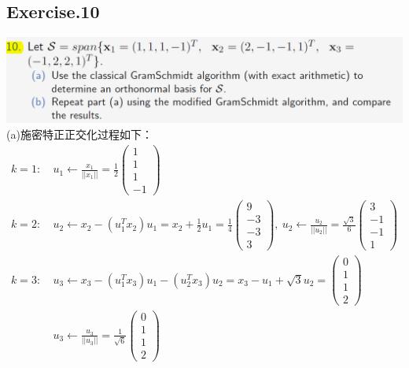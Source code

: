 \documentclass[UTF8,12pt, a4paper]{ctexart}
\begin{document}
\subsection*{Exercise.10}
\includegraphics[scale=0.8]{question10.png}\\
(a)施密特正正交化过程如下：
\begin{align*}
  k=1: &\  u_1 \leftarrow \frac{x_1}{||x_1||} 
  = \frac{1}{2}
  \left(
    \begin{matrix}
      1 \\ 1\\ 1\\ -1
    \end{matrix}
  \right) \\
  k=2: &\  u_2 \leftarrow x_2-(u_1^Tx_2)u_1 
  = x_2+\frac{1}{2}u_1 
  = \frac{1}{4} 
  \left(
    \begin{matrix}
      9 \\ -3 \\ -3 \\ 3
    \end{matrix}
  \right),\ u_2\leftarrow \frac{u_2}{||u_2||}
  = \frac{\sqrt{3}}{6} \left(
    \begin{matrix}
      3 \\ -1 \\ -1 \\ 1
    \end{matrix}  
  \right) \\
  k=3: &\  u_3 \leftarrow x_3 -(u_1^T x_3)u_1 - (u_2^Tx_3)u_2 =x_3-u_1+\sqrt{3}u_2 
  =\left(
    \begin{matrix}
      0 \\ 1 \\ 1 \\ 2
    \end{matrix}  
  \right) \\
  &\  u_3 \leftarrow \frac{u_3}{||u_3||} 
  = \frac{1}{\sqrt{6}} \left(
    \begin{matrix}
      0 \\ 1 \\ 1 \\ 2
    \end{matrix}  
  \right)\\

\end{align*}
\end{document}
